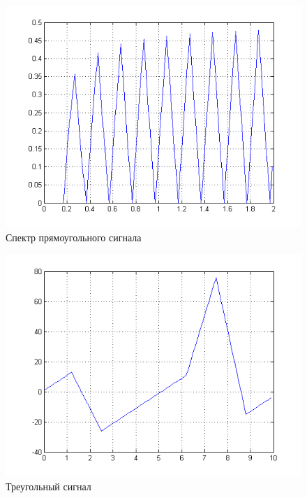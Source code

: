 \begin{figure}[H]
   \includegraphics[scale=0.7]{lab5/rect_spectro.png}
   \caption{Спектр прямоугольного сигнала}
\end{figure}

\begin{figure}[H]
   \includegraphics[scale=0.7]{lab5/triangle.png}
   \caption{Треугольный сигнал}
\end{figure}

